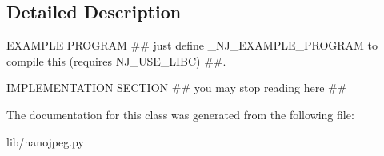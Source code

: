 \subsection{Detailed Description}
E\+X\+A\+M\+P\+LE P\+R\+O\+G\+R\+AM \#\# just define \+\_\+\+N\+J\+\_\+\+E\+X\+A\+M\+P\+L\+E\+\_\+\+P\+R\+O\+G\+R\+AM to compile this (requires N\+J\+\_\+\+U\+S\+E\+\_\+\+L\+I\+BC) \#\#. 

I\+M\+P\+L\+E\+M\+E\+N\+T\+A\+T\+I\+ON S\+E\+C\+T\+I\+ON \#\# you may stop reading here \#\# 

The documentation for this class was generated from the following file\+:\begin{DoxyCompactItemize}
\item 
lib/nanojpeg.\+py\end{DoxyCompactItemize}
